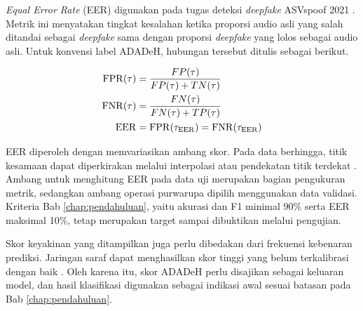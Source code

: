 \textit{Equal Error Rate} (EER) digunakan pada tugas deteksi \textit{deepfake} ASVspoof 2021 \autocite{delgado2021asvspoof}. Metrik ini menyatakan tingkat kesalahan ketika proporsi audio asli yang salah ditandai sebagai \textit{deepfake} sama dengan proporsi \textit{deepfake} yang lolos sebagai audio asli. Untuk konvensi label ADADeH, hubungan tersebut ditulis sebagai berikut.

\begin{align}
  \mathrm{FPR}(\tau) &= \frac{FP(\tau)}{FP(\tau) + TN(\tau)} \notag \\
  \mathrm{FNR}(\tau) &= \frac{FN(\tau)}{FN(\tau) + TP(\tau)} \notag \\
  \mathrm{EER} &= \mathrm{FPR}(\tau_{\mathrm{EER}}) = \mathrm{FNR}(\tau_{\mathrm{EER}})
  \label{eq:eer}
\end{align}

EER diperoleh dengan memvariasikan ambang skor. Pada data berhingga, titik kesamaan dapat diperkirakan melalui interpolasi atau pendekatan titik terdekat \autocite{delgado2021asvspoof}. Ambang untuk menghitung EER pada data uji merupakan bagian pengukuran metrik, sedangkan ambang operasi purwarupa dipilih menggunakan data validasi. Kriteria Bab \ref{chap:pendahuluan}, yaitu akurasi dan F1 minimal 90\% serta EER maksimal 10\%, tetap merupakan target sampai dibuktikan melalui pengujian.

Skor keyakinan yang ditampilkan juga perlu dibedakan dari frekuensi kebenaran prediksi. Jaringan saraf dapat menghasilkan skor tinggi yang belum terkalibrasi dengan baik \autocite{guo2017calibration}. Oleh karena itu, skor ADADeH perlu disajikan sebagai keluaran model, dan hasil klasifikasi digunakan sebagai indikasi awal sesuai batasan pada Bab \ref{chap:pendahuluan}.



